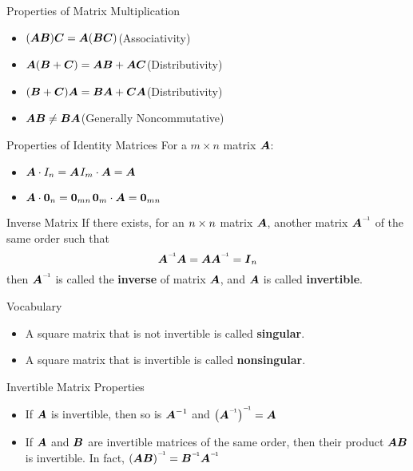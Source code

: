 \documentclass{beamer}
\begin{document}
\begin{frame}
\begin{block}{Properties of Matrix Multiplication}
\begin{itemize}
\item $(\boldsymbol{A}\boldsymbol{B})\boldsymbol{C}=\boldsymbol{A}(\boldsymbol{B}\boldsymbol{C})$\hfill (Associativity)
\item $\boldsymbol{A}(\boldsymbol{B}+\boldsymbol{C})=\boldsymbol{A}\boldsymbol{B}+\boldsymbol{A}\boldsymbol{C}$\hfill (Distributivity)
\item $(\boldsymbol{B}+\boldsymbol{C})\boldsymbol{A}=\boldsymbol{B}\boldsymbol{A}+\boldsymbol{C}\boldsymbol{A}$\hfill (Distributivity)\pause
\item $\boldsymbol{A}\boldsymbol{B}\neq \boldsymbol{B}\boldsymbol{A}$\hfill (Generally Noncommutative)
\end{itemize}
\end{block}\pause
\begin{block}{Properties of Identity Matrices}
For a $m\times n$ matrix $\boldsymbol{A}$:
\begin{itemize}
\item $\boldsymbol{A}\cdot I_n = \boldsymbol{A}$\quad{}\quad$I_m\cdot \boldsymbol{A} = \boldsymbol{A}$
\item $\boldsymbol{A}\cdot\boldsymbol{0}_{n} = \boldsymbol{0}_{mn}$\quad{}\quad$\boldsymbol{0}_{m}\cdot \boldsymbol{A}=\boldsymbol{0}_{mn}$
\end{itemize}
\end{block}
\end{frame}

\begin{frame}
\begin{block}{Inverse Matrix}
If there exists, for an $n \times n$ matrix $\boldsymbol{A}$, another matrix $\inverseof{\mat{A}}$ of the same order such that
\begin{equation*}
\inverseof{\mat{A}}\mat{A}=\mat{A}\inverseof{\mat{A}}=\identmat{n}
\end{equation*}
then $\inverseof{\mat{A}}$ is called the \textbf{inverse} of matrix $\boldsymbol{A}$, and $\boldsymbol{A}$ is called \textbf{invertible}.
\end{block}\pause
\begin{block}{Vocabulary}
\begin{itemize}
\item A square matrix that is not invertible is called \textbf{singular}.
\item A square matrix that is invertible is called \textbf{nonsingular}.
\end{itemize}
\end{block}\pause
\begin{block}{Invertible Matrix Properties}
\begin{itemize}
\item<+-> If $\boldsymbol{A}$ is invertible, then so is $\boldsymbol{A}^{-1}$ and $\inverseof{\left(\inverseof{\mat{A}}\right)}=\mat{A}$
\item<+-> If $\boldsymbol{A}$ and $\boldsymbol{B}$ are invertible matrices of the same order, then their product $\boldsymbol{A}\boldsymbol{B}$ is invertible. In fact, $\inverseof{\left(\mat{A}\mat{B}\right)}=\inverseof{\mat{B}}\inverseof{\mat{A}}$
\end{itemize}
\end{block}
\end{frame}
\end{document}
